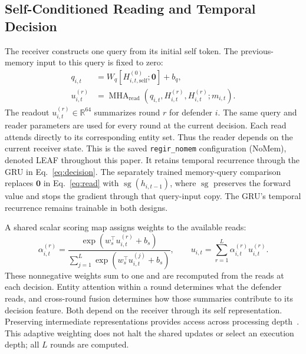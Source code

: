 \subsection{Self-Conditioned Reading and Temporal Decision}
The receiver constructs one query from its initial self token. The previous-memory input to this query is fixed to zero:
\begin{align}
 q_{i,t}&=W_q[H^{(0)}_{i,t,\mathrm{self}};
                    \mathbf 0]+b_q,\nonumber\\
 u_{i,t}^{(r)}&=\operatorname{MHA}_{\mathrm{read}}
                  (q_{i,t},H_{i,t}^{(r)},H_{i,t}^{(r)};m_{i,t}).
 \label{eq:read}
\end{align}
The readout $u_{i,t}^{(r)}\in\mathbb R^{64}$ summarizes round $r$ for defender $i$. The same query and reader parameters are used for every round at the current decision. Each read attends directly to its corresponding entity set. Thus the reader depends on the current receiver state. This is the saved \texttt{regir\_nomem} configuration (NoMem), denoted LEAF throughout this paper. It retains temporal recurrence through the GRU in Eq.~\eqref{eq:decision}. The separately trained memory-query comparison replaces $\mathbf 0$ in Eq.~\eqref{eq:read} with $\operatorname{sg}(h_{i,t-1})$, where $\operatorname{sg}$ preserves the forward value and stops the gradient through that query-input copy. The GRU's temporal recurrence remains trainable in both designs.

A shared scalar scoring map assigns weights to the available reads:
\begin{equation}
 \alpha_{i,t}^{(r)}=
 \frac{\exp(w_s^\top u_{i,t}^{(r)}+b_s)}
 {\sum_{j=1}^{L}\exp(w_s^\top u_{i,t}^{(j)}+b_s)},\qquad
 u_{i,t}=\sum_{r=1}^{L}\alpha_{i,t}^{(r)}u_{i,t}^{(r)}.
 \label{eq:fusion}
\end{equation}
These nonnegative weights sum to one and are recomputed from the reads at each decision. Entity attention within a round determines what the defender reads, and cross-round fusion determines how those summaries contribute to its decision feature. Both depend on the receiver through its self representation. Preserving intermediate representations provides access across processing depth~\cite{xu2018jk}. This adaptive weighting does not halt the shared updates or select an execution depth; all $L$ rounds are computed.


